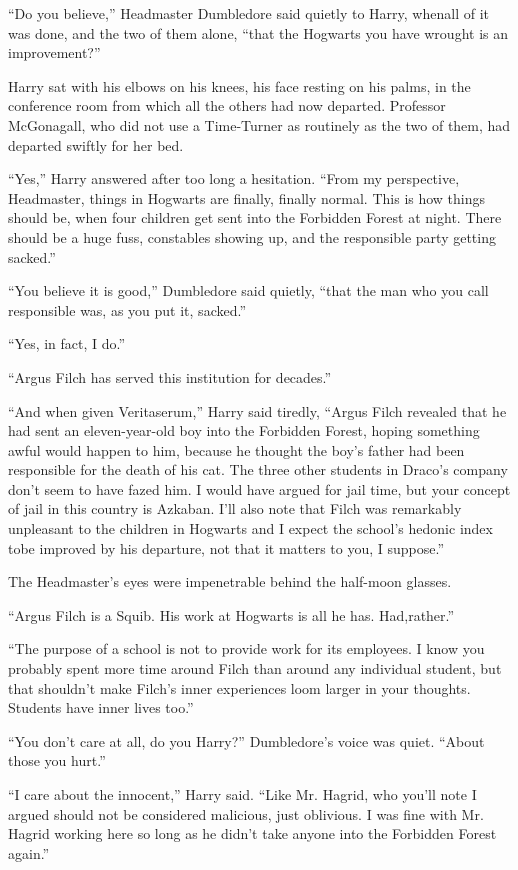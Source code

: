 ``Do you believe,'' Headmaster Dumbledore said quietly to Harry, whenall of it was done, and the two of them alone, ``that the Hogwarts you have wrought is an improvement?''

Harry sat with his elbows on his knees, his face resting on his palms, in the conference room from which all the others had now departed. Professor McGonagall, who did not use a Time-Turner as routinely as the two of them, had departed swiftly for her bed.

``Yes,'' Harry answered after too long a hesitation. ``From my perspective, Headmaster, things in Hogwarts are finally, finally normal. This is how things should be, when four children get sent into the Forbidden Forest at night. There should be a huge fuss, constables showing up, and the responsible party getting sacked.''

``You believe it is good,'' Dumbledore said quietly, ``that the man who you call responsible was, as you put it, sacked.''

``Yes, in fact, I do.''

``Argus Filch has served this institution for decades.''

``And when given Veritaserum,'' Harry said tiredly, ``Argus Filch revealed that he had sent an eleven-year-old boy into the Forbidden Forest, hoping something awful would happen to him, because he thought the boy's father had been responsible for the death of his cat. The three other students in Draco's company don't seem to have fazed him. I would have argued for jail time, but your concept of jail in this country is Azkaban. I'll also note that Filch was remarkably unpleasant to the children in Hogwarts and I expect the school's hedonic index tobe improved by his departure, not that it matters to you, I suppose.''

The Headmaster's eyes were impenetrable behind the half-moon glasses.

``Argus Filch is a Squib. His work at Hogwarts is all he has. Had,rather.''

``The purpose of a school is not to provide work for its employees. I know you probably spent more time around Filch than around any individual student, but that shouldn't make Filch's inner experiences loom larger in your thoughts. Students have inner lives too.''

``You don't care at all, do you Harry?'' Dumbledore's voice was quiet. ``About those you hurt.''

``I care about the innocent,'' Harry said. ``Like Mr. Hagrid, who you'll note I argued should not be considered malicious, just oblivious. I was fine with Mr. Hagrid working here so long as he didn't take anyone into the Forbidden Forest again.''

